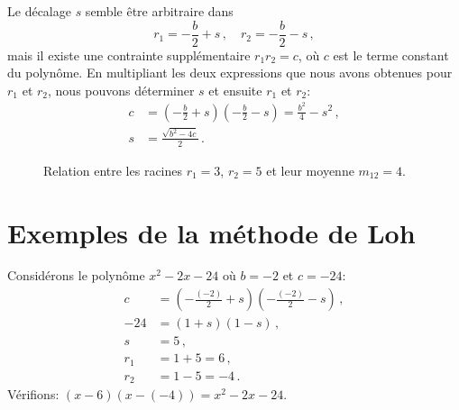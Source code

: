 Le décalage $s$ semble être arbitraire dans
\[
r_1=-\frac{b}{2}+s\,,\quad r_2=-\frac{b}{2}-s\,,
\]
mais il existe une contrainte supplémentaire $r_1r_2=c$, où $c$ est le terme constant du polynôme.
En multipliant les deux expressions que nous avons obtenues pour $r_1$ et $r_2$, nous pouvons déterminer $s$ et ensuite $r_1$ et $r_2$:
\begin{align*}
c&=\left(-\frac{b}{2} +s\right)\left(-\frac{b}{2} -s\right)=
  \frac{b^2}{4}-s^2\,,\\
s&=\frac{\sqrt{b^2-4c}}{2}\,.
\end{align*}

\begin{figure}[htbp]
\centering
{}
\caption{Relation entre les racines $r_1=3$, $r_2=5$ et leur moyenne $m_{12}=4$.}
\label{f.loh-roots2}
\end{figure}

\section{Exemples de la méthode de Loh}\label{s.examples}

\begin{example}
Considérons le polynôme $x^2-2x-24$ où $b=-2$ et $c=-24$:
\begin{align*}
c&=\left(-\frac{(-2)}{2} +s\right)\left(-\frac{(-2)}{2} -s\right)\,,\\
-24&=(1 +s)(1 -s)\,,\\
s&=5\,,\\
r_1&=1+5=6\,,\\
r_2&=1-5=-4\,.
\end{align*}
Vérifions: $(x-6)(x-(-4))= x^2-2x-24$.
\end{example}

